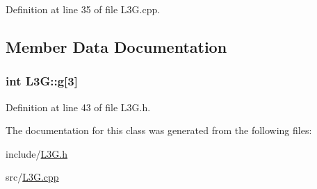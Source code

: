 \-Definition at line 35 of file \-L3\-G.\-cpp.



\subsection{\-Member \-Data \-Documentation}
\hypertarget{class_l3_g_a0cb874e50a2ea4753d81e9a46c7e45ce}{
\subsubsection[{g}]{\setlength{\rightskip}{0pt plus 5cm}int {\bf \-L3\-G\-::g}\mbox{[}3\mbox{]}}}\label{class_l3_g_a0cb874e50a2ea4753d81e9a46c7e45ce}


\-Definition at line 43 of file \-L3\-G.\-h.



\-The documentation for this class was generated from the following files\-:\begin{DoxyCompactItemize}
\item 
include/\hyperlink{_l3_g_8h}{\-L3\-G.\-h}\item 
src/\hyperlink{_l3_g_8cpp}{\-L3\-G.\-cpp}\end{DoxyCompactItemize}
